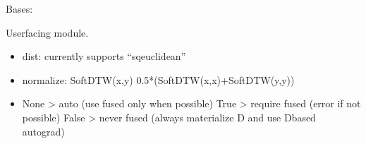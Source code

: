 \documentclass[letterpaper,10pt,english]{sphinxmanual}
\begin{document}
\begin{fulllineitems}
\label{\detokenize{dtw_loss_functions.soft_dtw_implementations.soft_dtw_cuda_ron.module:dtw_loss_functions.soft_dtw_implementations.soft_dtw_cuda_ron.module.SoftDTW}}
\pysigstartsignatures
\pysiglinewithargsret
{}
{\sphinxparamcomma {}\sphinxparamcomma {}\sphinxparamcomma {}\sphinxparamcomma {}\sphinxparamcomma {}}
{}
\pysigstopsignatures
\sphinxAtStartPar
Bases: 

\sphinxAtStartPar
User\sphinxhyphen{}facing module.
\begin{itemize}
\item {} 
\sphinxAtStartPar
dist: currently supports “sqeuclidean”

\item {} 
\sphinxAtStartPar
normalize: SoftDTW(x,y) \sphinxhyphen{} 0.5*(SoftDTW(x,x)+SoftDTW(y,y))

\item {} \begin{description}
\sphinxAtStartPar
None  \sphinxhyphen{}\textgreater{} auto (use fused only when possible)
True  \sphinxhyphen{}\textgreater{} require fused (error if not possible)
False \sphinxhyphen{}\textgreater{} never fused (always materialize D and use D\sphinxhyphen{}based autograd)

\end{description}


\end{itemize}
\end{fulllineitems}
\end{document}
